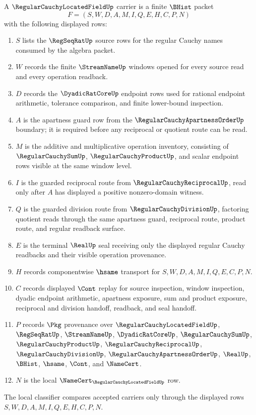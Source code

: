 \begin{definition}
\label{def:regular-cauchy-located-field-carrier}
A $\RegularCauchyLocatedFieldUp$ carrier is a finite $\BHist$ packet
$$
F=(S,W,D,A,M,I,Q,E,H,C,P,N)
$$
with the following displayed rows:
\begin{enumerate}
\item $S$ lists the $\RegSeqRatUp$ source rows for the regular Cauchy names consumed by the algebra packet.
\item $W$ records the finite $\StreamNameUp$ windows opened for every source read and every operation readback.
\item $D$ records the $\DyadicRatCoreUp$ endpoint rows used for rational endpoint arithmetic, tolerance comparison, and finite lower-bound inspection.
\item $A$ is the apartness guard row from the $\RegularCauchyApartnessOrderUp$ boundary; it is required before any reciprocal or quotient route can be read.
\item $M$ is the additive and multiplicative operation inventory, consisting of $\RegularCauchySumUp$, $\RegularCauchyProductUp$, and scalar endpoint rows visible at the same window level.
\item $I$ is the guarded reciprocal route from $\RegularCauchyReciprocalUp$, read only after $A$ has displayed a positive nonzero-domain witness.
\item $Q$ is the guarded division route from $\RegularCauchyDivisionUp$, factoring quotient reads through the same apartness guard, reciprocal route, product route, and regular readback surface.
\item $E$ is the terminal $\RealUp$ seal receiving only the displayed regular Cauchy readbacks and their visible operation provenance.
\item $H$ records componentwise $\hsame$ transport for $S,W,D,A,M,I,Q,E,C,P,N$.
\item $C$ records displayed $\Cont$ replay for source inspection, window inspection, dyadic endpoint arithmetic, apartness exposure, sum and product exposure, reciprocal and division handoff, readback, and seal handoff.
\item $P$ records $\Pkg$ provenance over $\RegularCauchyLocatedFieldUp$, $\RegSeqRatUp$, $\StreamNameUp$, $\DyadicRatCoreUp$, $\RegularCauchySumUp$, $\RegularCauchyProductUp$, $\RegularCauchyReciprocalUp$, $\RegularCauchyDivisionUp$, $\RegularCauchyApartnessOrderUp$, $\RealUp$, $\BHist$, $\hsame$, $\Cont$, and $\NameCert$.
\item $N$ is the local $\NameCert_{\RegularCauchyLocatedFieldUp}$ row.
\end{enumerate}
The local classifier compares accepted carriers only through the displayed rows $S,W,D,A,M,I,Q,E,H,C,P,N$.
\end{definition}

